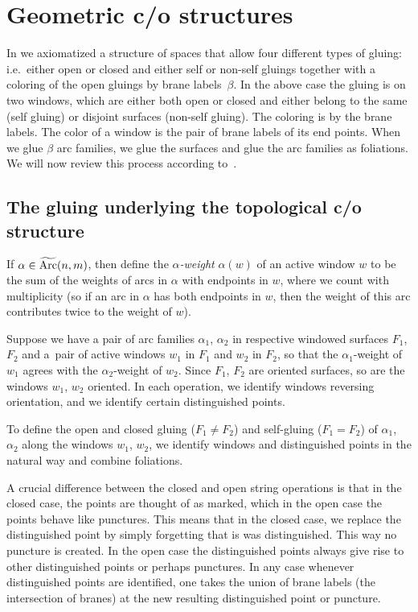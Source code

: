 \section{Geometric c/o structures}
\label{geosection}

In \cite{KP} we axiomatized a structure of spaces that allow four dif\/ferent types of gluing: i.e.\
either open or closed and either self or non-self gluings together with a coloring of the open gluings by brane labels~$\beta$. In the above case the gluing is on two  windows, which are either both
open or closed and either belong to the same (self gluing) or disjoint surfaces (non-self gluing).
The coloring is by the brane labels. The color of a window is the pair of brane labels of its
end points. When we glue $\beta$ arc families, we glue the surfaces and
glue the arc families as foliations. We will now review this process according to~\cite{KP}.


\subsection{The gluing underlying the topological c/o structure}




If $\alpha\in\widetilde{\rm Arc} (n,m)$, then def\/ine the {\it $\alpha$-weight} $\alpha(w)$ of an active window $w$ to be the sum
of
the weights of arcs in $\alpha$ with endpoints in $w$, where we count with multiplicity
(so if an arc in $\alpha$ has both endpoints in $w$, then the weight of this arc contributes twice to the weight of
$w$).

Suppose we have a pair of arc families $\alpha_1$, $\alpha _2$
in respective windowed surfaces $F_1$, $F_2$ and a~pair of active windows $w_1$ in $F_1$ and $w_2$ in $F_2$, so that the
$\alpha _1$-weight of $w_1$ agrees with the $\alpha _2$-weight of $w_2$.
Since $F_1$, $F_2$ are oriented surfaces, so are the windows $w_1$, $w_2$ oriented.   In each operation, we
identify windows reversing orientation, and we identify certain distinguished points.

To def\/ine the open and closed gluing ($F_1\neq F_2$) and self-gluing ($F_1=F_2$) of $\alpha_1$, $\alpha _2$ along the
windows
$w_1$, $w_2$, we
identify windows and distinguished points in the natural way and combine foliations.

A crucial dif\/ference  between the closed and open string operations is that in the closed case,
the points are thought of as marked, which in the open case the points behave like punctures.
This means that in the closed case, we
replace the  distinguished point by simply forgetting that is was distinguished. This way  no puncture is created. In the open case the distinguished
points
always give rise to other distinguished points or perhaps punctures.
 In any case whenever distinguished points are
identif\/ied, one takes the union of brane labels (the intersection of branes) at the new resulting distinguished point or puncture.

